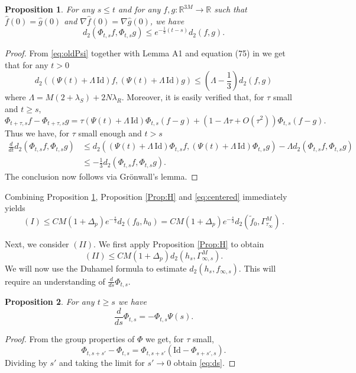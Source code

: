\documentclass{article}
\newcommand \Id{\mathrm{Id}}
\newcommand*\R{ \mathds{R} }
\newtheorem{Prop}{Proposition}
\begin{document}
\begin{Prop}\label{Prop:Contraction}
For any $s \leq t$ and for any $f, g: \R^{3M} \to \R$ such that $\hat f (0) = \hat g(0)$ and $\nabla \hat f(0) = \nabla 
\hat g(0)$, we have
%
\[
d_2(\Phi_{t,s} f, \Phi_{t,s} g) \leq e^{-\frac 13(t - s)} d_2(f,g).
\]
%
\end{Prop}
\begin{proof}
From \eqref{eq:oldPsi} together with Lemma A1 and equation (75) in \cite{BLP25} we get that for any $t>0$
%
\[
d_2((\Psi(t) + \Lambda\, \Id) f, (\Psi(t) + \Lambda\,  \Id) g) \leq \left(\Lambda -\frac13\right)d_2(f,g)
\]
where $\Lambda=M(2+\lambda_S)+2N\lambda_R$.
Moreover, it is easily verified that, for $\tau$ small and $t \geq s$,
%
\[
\Phi_{t+ \tau,s} f - \Phi_{t + \tau,s} g = \tau\left(\Psi(t) + \Lambda\,  \Id\right)  \Phi_{t,s}(f - g) + (1 - \Lambda
\tau + O(\tau^2)) \Phi_{t,s}(f - g) .
\]
%
Thus we have, for $\tau$ small enough and $t > s$
%
\begin{align*}
\frac{d}{dt} d_2( \Phi_{t,s}f, \Phi_{t,s}g) &\leq d_2(\left(\Psi(t) + \Lambda\,  \Id\right) \Phi_{t,s}f, \left(\Psi(t) 
+ 
\Lambda\,  \Id\right) \Phi_{t,s}g) - \Lambda d_2(\Phi_{t,s}f, \Phi_{t,s}g) \\
&\leq -\frac13 d_2(\Phi_{t,s}f, \Phi_{t,s}g).
\end{align*}
%
The conclusion now follows via Gr\"onwall's lemma.
\end{proof}

 Combining
Proposition \ref{Prop:Contraction}, Proposition \ref{Prop:H} and \eqref{eq:centered} immediately yields
\[
(I) \leq C M (1+\Delta_p)e^{-\frac s3} d_2(f_0, h_0)=C M (1+\Delta_p)e^{-\frac s3} d_2(\tilde f_0, 
\Gamma^M_{\tau_\infty})\, 
.
\]

Next, we consider $(II)$. We first apply Proposition \ref{Prop:H} to obtain
\begin{equation}\label{eq:IIH}
(II) \leq C M \left(1 + \Delta_p\right) d_2(h_s, \Gamma^M_{\infty,s}).
\end{equation}
We will now use the Duhamel formula to estimate $d_2(h_s, f_{\infty,s})$. This will require an understanding of 
$\frac{d}{ds} \Phi_{t,s}$. 

\begin{Prop}
For any $t \geq s$ we have
\begin{equation}
\label{eq:ds}
\frac{d}{ds} \Phi_{t,s} = -\Phi_{t,s} \Psi(s).
\end{equation}
\end{Prop}

\begin{proof}
From the group properties of $\Phi$ we get, for $\tau$ small,
\[
\Phi_{t,s+s'}-\Phi_{t,s}=\Phi_{t,s+s'}(\Id - \Phi_{s+s',s}).
\] 
Dividing by $s'$ and taking the limit for $s'\to 0$ obtain \eqref{eq:ds}.
\end{proof}
\end{document}
